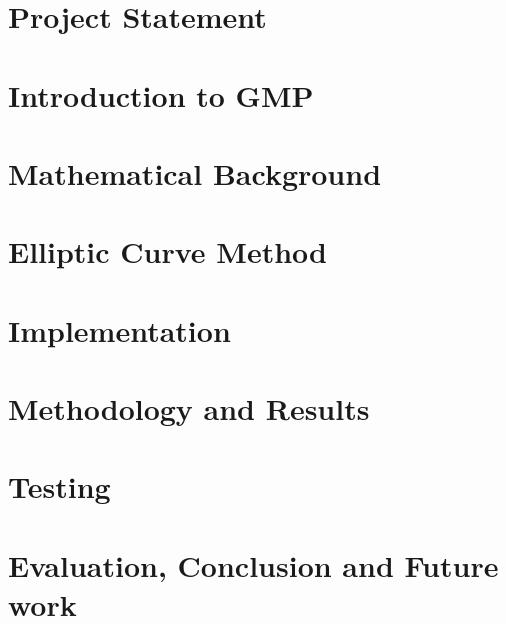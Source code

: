\documentclass[onehalfspacing,final,12pt,a4paper,oneside]{YasarThesis}
\begin{document}
 
	\chapter{Project Statement}\label{ch:Statement}
	
	
	\chapter{Introduction to GMP}\label{ch:Literature}
	
	 
	\chapter{Mathematical Background}\label{ch:Mathematical}
	
	
	\chapter{Elliptic Curve Method}\label{ch:Elliptic}
	
	
	\chapter{Implementation}\label{ch:Main}
	

	\chapter{Methodology and Results}\label{ch:Methodology}
	

	\chapter{Testing}\label{ch:Testing}
	

	\chapter{Evaluation, Conclusion and Future work}\label{ch:Conclusion}
	
	
	\cite{*}
	
	\appendix
  	\chapter{~}
  	\vspace{-30mm}
	
	
	\backmatter{}
	
	
\end{document}
